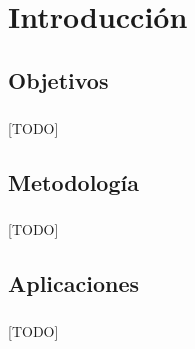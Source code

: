 \documentclass{subfiles}
\begin{document}
  \chapter{Introducción}
  \label{chap:introduction}

    \section{Objetivos}
    \label{sec:introduction_objectives}

      \paragraph{}
      [TODO]

    \section{Metodología}
    \label{sec:introduction_metodology}

      \paragraph{}
      [TODO]

    \section{Aplicaciones}
    \label{sec:introduction_applications}

      \paragraph{}
      [TODO]
\end{document}
